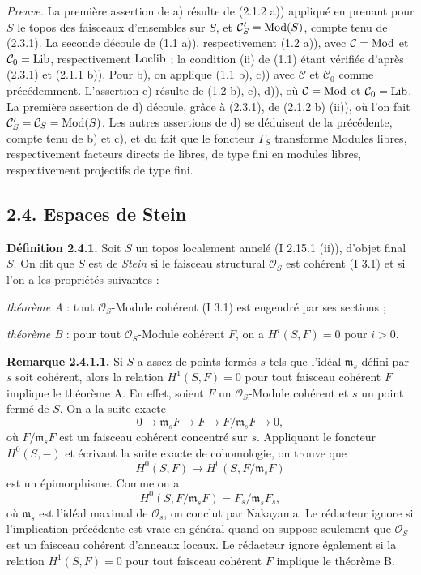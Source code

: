 \documentclass[11pt]{article}
\begin{document}
\emph{Preuve.} La première assertion de a) résulte de (2.1.2 a)) appliqué en prenant pour $S$ le topos des faisceaux d'ensembles sur $S$, et $\mathcal C'_S=\operatorname{Mod}(S)$, compte tenu de (2.3.1). La seconde découle de (1.1 a)), respectivement (1.2 a)), avec $\mathcal C=\operatorname{Mod}$ et $\mathcal C_0=\operatorname{Lib}$, respectivement $\operatorname{Loclib}$ ; la condition (ii) de (1.1) étant vérifiée d'après (2.3.1) et (2.1.1 b)). Pour b), on applique (1.1 b), c)) avec $\mathcal C$ et $\mathcal C_0$ comme précédemment. L'assertion c) résulte de (1.2 b), c), d)), où $\mathcal C=\operatorname{Mod}$ et $\mathcal C_0=\operatorname{Lib}$. La première assertion de d) découle, grâce à (2.3.1), de (2.1.2 b) (ii)), où l'on fait $\mathcal C'_S=\mathcal C_S=\operatorname{Mod}(S)$. Les autres assertions de d) se déduisent de la précédente, compte tenu de b) et c), et du fait que le foncteur $\Gamma_S$ transforme Modules libres, respectivement facteurs directs de libres, de type fini en modules libres, respectivement projectifs de type fini.

\subsection*{2.4. Espaces de Stein}

\textbf{Définition 2.4.1.} Soit $S$ un topos localement annelé (I 2.15.1 (ii)), d'objet final $S$. On dit que $S$ est de \emph{Stein} si le faisceau structural $\mathcal O_S$ est cohérent (I 3.1) et si l'on a les propriétés suivantes :

\emph{théorème A} : tout $\mathcal O_S$-Module cohérent (I 3.1) est engendré par ses sections ;

\emph{théorème B} : pour tout $\mathcal O_S$-Module cohérent $F$, on a $H^i(S,F)=0$ pour $i>0$.

\textbf{Remarque 2.4.1.1.} Si $S$ a assez de points fermés $s$ tels que l'idéal $\mathfrak m_s$ défini par $s$ soit cohérent, alors la relation $H^1(S,F)=0$ pour tout faisceau cohérent $F$ implique le théorème A. En effet, soient $F$ un $\mathcal O_S$-Module cohérent et $s$ un point fermé de $S$. On a la suite exacte
\[
0\longrightarrow\mathfrak m_sF\longrightarrow F\longrightarrow F/\mathfrak m_sF\longrightarrow0,
\]
où $F/\mathfrak m_sF$ est un faisceau cohérent concentré sur $s$. Appliquant le foncteur $H^0(S,-)$ et écrivant la suite exacte de cohomologie, on trouve que
\[
H^0(S,F)\longrightarrow H^0(S,F/\mathfrak m_sF)
\]
est un épimorphisme. Comme on a
\[
H^0(S,F/\mathfrak m_sF)=F_s/\mathfrak m_sF_s,
\]
où $\mathfrak m_s$ est l'idéal maximal de $\mathcal O_s$, on conclut par Nakayama. Le rédacteur ignore si l'implication précédente est vraie en général quand on suppose seulement que $\mathcal O_S$ est un faisceau cohérent d'anneaux locaux. Le rédacteur ignore également si la relation $H^1(S,F)=0$ pour tout faisceau cohérent $F$ implique le théorème B.
\end{document}
